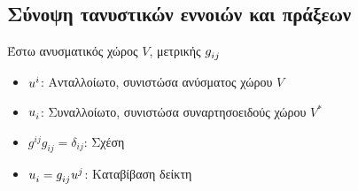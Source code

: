 \documentclass[main.tex]{subfiles}
\begin{document}
	\subsection{Σύνοψη τανυστικών εννοιών και πράξεων}
	Έστω ανυσματικός χώρος $V$, μετρικής $g\indices{_i_j}$
	\begin{itemize}
		\item $u\indices{^i}$: Ανταλλοίωτο, συνιστώσα ανύσματος χώρου $V$
		\item $u\indices{_i}$: Συναλλοίωτο, συνιστώσα συναρτησοειδούς χώρου $V^*$
		\item $g^{ij}g_{ij}=\delta_{ij}$: Σχέση 
		\item $u\indices{_i} = g\indices{_i_j}u\indices{^j}$: Καταβίβαση δείκτη
	\end{itemize}
\end{document}
